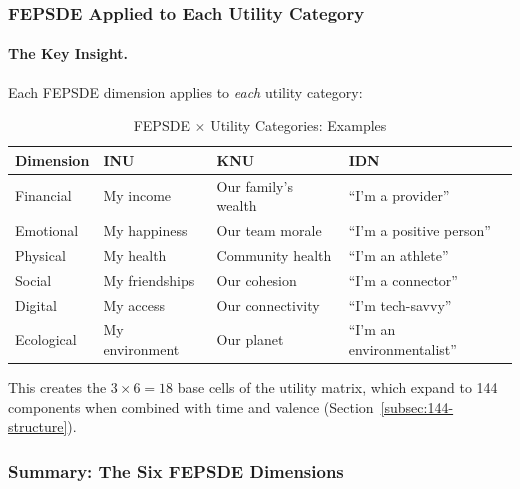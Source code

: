 \subsubsection{FEPSDE Applied to Each Utility Category}

\paragraph{The Key Insight.}
Each FEPSDE dimension applies to \emph{each} utility category:

\begin{table}[htbp]
\centering
\caption{FEPSDE $\times$ Utility Categories: Examples}
\label{tab:fepsde-categories}
\small
\renewcommand{\arraystretch}{1.3}
\begin{tabular}{@{}llll@{}}
\toprule
\textbf{Dimension} & \textbf{INU} & \textbf{KNU} & \textbf{IDN} \\
\midrule
Financial & My income & Our family's wealth & ``I'm a provider'' \\
Emotional & My happiness & Our team morale & ``I'm a positive person'' \\
Physical & My health & Community health & ``I'm an athlete'' \\
Social & My friendships & Our cohesion & ``I'm a connector'' \\
Digital & My access & Our connectivity & ``I'm tech-savvy'' \\
Ecological & My environment & Our planet & ``I'm an environmentalist'' \\
\bottomrule
\end{tabular}
\end{table}

This creates the $3 \times 6 = 18$ base cells of the utility matrix,
which expand to 144 components when combined with time and valence
(Section~\ref{subsec:144-structure}).

\subsubsection{Summary: The Six FEPSDE Dimensions}

